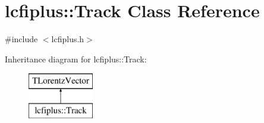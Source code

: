 \section{lcfiplus\-:\-:Track Class Reference}
\label{classlcfiplus_1_1Track}


{\ttfamily \#include $<$lcfiplus.\-h$>$}

Inheritance diagram for lcfiplus\-:\-:Track\-:\begin{figure}[H]
\begin{center}
\leavevmode
\includegraphics[height=2.000000cm]{classlcfiplus_1_1Track}
\end{center}
\end{figure}
